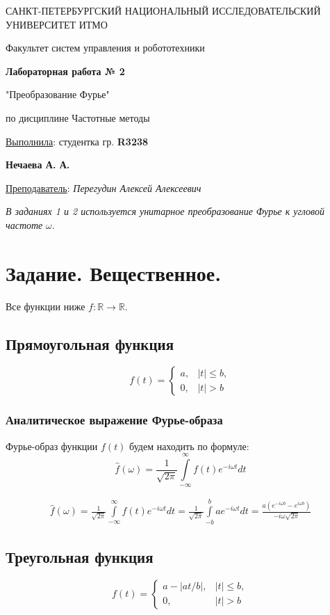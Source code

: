 \documentclass[a5paper, 10pt]{article}
\theoremstyle{definition}
\theoremstyle{plain}
\theoremstyle{remark}
\newcommand*{\titlePage}{
	\thispagestyle{title}
	\begingroup
	\begin{center}
		\vspace*{6ex}
		
		{\small
			САНКТ-ПЕТЕРБУРГСКИЙ НАЦИОНАЛЬНЫЙ ИССЛЕДОВАТЕЛЬСКИЙ УНИВЕРСИТЕТ ИТМО	
		}
		
		\vspace*{2ex}
		
		{\normalsize
			Факультет систем управления и робототехники
		}
		
		\vspace*{15ex}
		
		{\Large \bfseries 
			Лабораторная работа № 2
		}
\vspace*{2ex}
	{\Large \bfseries 
			
"Преобразование Фурье"
		}
\vspace*{2ex}
		
		{\normalsize
			по дисциплине Частотные методы
		}

	\end{center}
	\vspace*{20ex}
	\begin{flushright}
		{\large 
			\underline{Выполнила}: студентка гр. \textbf{R3238}\\
			\begin{flushright}
				\textbf{Нечаева А. А.}\\
			\end{flushright}
		}
		
		\vspace*{5ex}
		
		{\large 
			\underline{Преподаватель}: \textit{Перегудин Алексей Алексеевич}
		}
	\end{flushright}	
	\newpage
	\setcounter{page}{1}
	\endgroup}
\begin{document}
	\titlePage
	\pagestyle{style}
\newpage
\textit{В заданиях 1 и 2 используется унитарное преобразование Фурье к угловой частоте} $\omega$.




\section{Задание. Вещественное.}
Все функции ниже $f : \mathbb{R} \to \mathbb{R}$.

\subsection{Прямоугольная функция}

\begin{equation}
f(t) =
\begin{cases}
a, & |t| \leq b,\\
0, & |t| > b
\end{cases}
\end{equation}


\subsubsection{Аналитическое выражение Фурье-образа}

Фурье-образ функции $f(t)$ будем находить по формуле:
\begin{equation}
\hat{f}(\omega) = \frac{1}{\sqrt{2 \pi}} \int \limits_{-\infty}^{\infty} f(t) e^{-i \omega t} dt
\end{equation}



\begin{multline}
\hat{f}(\omega) = \frac{1}{\sqrt{2 \pi}} \int \limits_{-\infty}^{\infty} f(t) e^{-i \omega t} dt = \frac{1}{\sqrt{2 \pi}} \int \limits_{-b}^{b} a e^{-i \omega t} dt =   \frac{a ( e^{-i \omega b} -  e^{i \omega b})}{-i\omega \sqrt{2 \pi}}
\end{multline}


\newpage
\subsection{Треугольная функция}

\begin{equation}
f(t) =
\begin{cases}
a - |at / b|, & |t| \leq b,\\
0, & |t| > b
\end{cases}
\end{equation}
\end{document}
